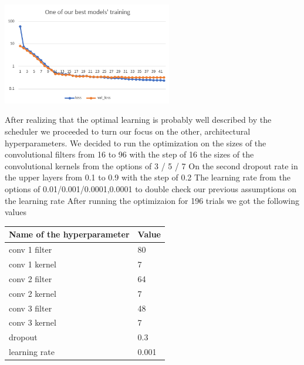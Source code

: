 \documentclass{article}
\begin{document}
\includegraphics[width=280px]{diagram.png}

After realizing that the optimal
learning is probably well described
by the scheduler we proceeded to
turn our focus on the other,
architectural hyperparameters. We decided to run the optimization on
	the sizes of the convolutional filters from 16 to 96 with the step of 16
	the sizes of the convolutional kernels from the options of 3 / 5 / 7
	On the second dropout rate in the upper layers from 0.1 to 0.9 with the step of 0.2
	The learning rate from the options of 0.01/0.001/0.0001,0.0001 to double check our previous assumptions on the learning rate
After running the optimizaion for 196 trials we got the following values

\begin{center}
\begin{tabular}{ | m{15em} | m{3em}| }
  \hline
  Name of the hyperparameter & Value  \\
  \hline
  \hline
  conv 1 filter & 80  \\
  \hline
  conv 1 kernel & 7 \\
  \hline
    conv 2 filter  & 64 \\
  \hline
    conv 2 kernel & 7 \\
  \hline
    conv 3 filter  & 48 \\
  \hline
    conv 3 kernel & 7 \\
  \hline
    dropout & 0.3 \\
      \hline
    learning rate & 0.001 \\
    \hline
\end{tabular}
\end{center}
\end{document}
